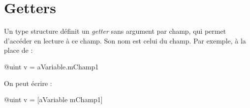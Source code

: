 \section{Getters}

Un type structure définit un \emph{getter} sans argument par champ, qui permet d'accéder en lecture à ce champ. Son nom est celui du champ. Par exemple, à la place de :
\begin{galgas}
@uint v = aVariable.mChamp1
\end{galgas}

On peut écrire :
\begin{galgas}
@uint v = [aVariable mChamp1]
\end{galgas}

